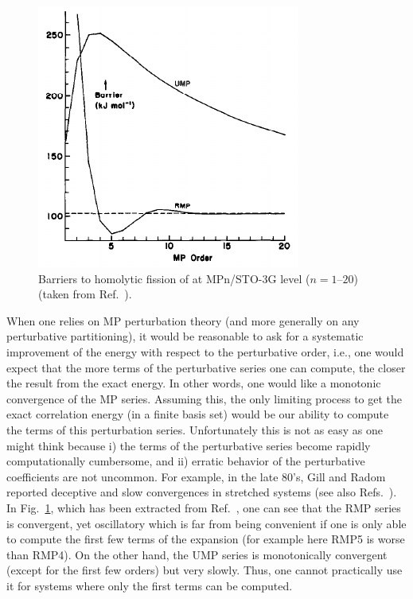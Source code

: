 \documentclass[11pt,a4paper]{article}
\begin{document}
\begin{figure}
    \centering
    \includegraphics[width=\linewidth]{gill1986.png}
    \caption{Barriers to homolytic fission of  at MPn/STO-3G level ($n = 1$--$20$) (taken from Ref.~\cite{Gill_1986}).}
    \label{fig:RUMP_Gill}
\end{figure}
When one relies on MP perturbation theory (and more generally on any perturbative partitioning), it would be reasonable to ask for a systematic improvement of the energy with respect to the perturbative order, i.e., one would expect that the more terms of the perturbative series one can compute, the closer the result from the exact energy.
In other words, one would like a monotonic convergence of the MP series. Assuming this, the only limiting process to get the exact correlation energy (in a finite basis set) would be our ability to compute the terms of this perturbation series.
Unfortunately this is not as easy as one might think because i) the terms of the perturbative series become rapidly computationally cumbersome, and ii) erratic behavior of the perturbative coefficients are not uncommon. For example, in the late 80's, Gill and Radom reported deceptive and slow convergences in stretched systems \cite{Gill_1986, Gill_1988} (see also Refs.~\cite{Handy_1985, Lepetit_1988}). 
In Fig.~\ref{fig:RUMP_Gill}, which has been extracted from Ref.~\cite{Gill_1986}, one can see that the RMP series is convergent, yet oscillatory which is far from being convenient if one is only able to compute the first few terms of the expansion (for example here RMP5 is worse than RMP4). 
On the other hand, the UMP series is monotonically convergent (except for the first few orders) but very slowly. 
Thus, one cannot practically use it for systems where only the first terms can be computed.
\end{document}
